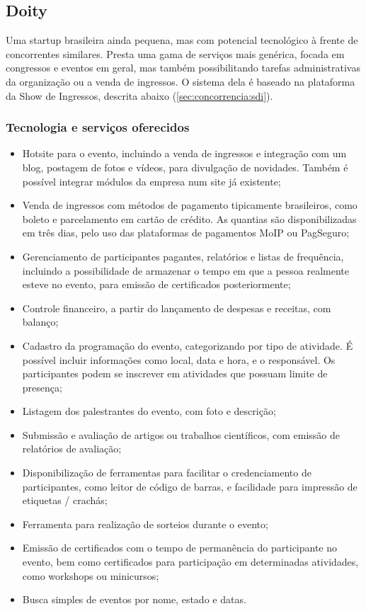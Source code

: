 \documentclass[12pt,a4paper,twoside,hyphens,english,brazil]{abntex2}
\begin{document}
\subsection{Doity}
Uma startup brasileira ainda pequena, mas com potencial tecnológico à frente de concorrentes similares. Presta uma gama de serviços mais genérica, focada em congressos e eventos em geral, mas também possibilitando tarefas administrativas da organização ou a venda de ingressos.\cite{doity-como-funciona} O sistema dela é baseado na plataforma da Show de Ingressos, descrita abaixo (\autoref{sec:concorrencia:sdi}).

\subsubsection*{Tecnologia e serviços oferecidos}
\begin{itemize}[itemsep=-1ex]
	\item Hotsite para o evento, incluindo a venda de ingressos e integração com um blog, postagem de fotos e vídeos, para divulgação de novidades. Também é possível integrar módulos da empresa num site já existente;
	\item Venda de ingressos com métodos de pagamento tipicamente brasileiros, como boleto e parcelamento em cartão de crédito. As quantias são disponibilizadas em três dias, pelo uso das plataformas de pagamentos MoIP ou PagSeguro;
	\item Gerenciamento de participantes pagantes, relatórios e listas de frequência, incluindo a possibilidade de armazenar o tempo em que a pessoa realmente esteve no evento, para emissão de certificados posteriormente;
	\item Controle financeiro, a partir do lançamento de despesas e receitas, com balanço;
	\item Cadastro da programação do evento, categorizando por tipo de atividade. É possível incluir informações como local, data e hora, e o responsável. Os participantes podem se inscrever em atividades que possuam limite de presença;
	\item Listagem dos palestrantes do evento, com foto e descrição;
	\item Submissão e avaliação de artigos ou trabalhos científicos, com emissão de relatórios de avaliação;
	\item Disponibilização de ferramentas para facilitar o credenciamento de participantes, como leitor de código de barras, e facilidade para impressão de etiquetas / crachás;
	\item Ferramenta para realização de sorteios durante o evento;
	\item Emissão de certificados com o tempo de permanência do participante no evento, bem como certificados para participação em determinadas atividades, como workshops ou minicursos;
	\item Busca simples de eventos por nome, estado e datas.
\end{itemize}
\end{document}
